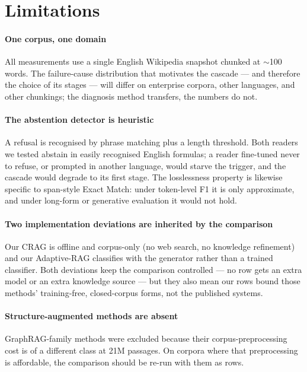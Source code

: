 \section{Limitations}
\label{sec:limitations}

\paragraph{One corpus, one domain} All measurements use a single English
Wikipedia snapshot chunked at $\sim$100 words. The failure-cause
distribution that motivates the cascade --- and therefore the choice of
its stages --- will differ on enterprise corpora, other languages, and
other chunkings; the diagnosis method transfers, the numbers do not.

\paragraph{The abstention detector is heuristic} A refusal is recognised
by phrase matching plus a length threshold. Both readers we tested
abstain in easily recognised English formulas; a reader fine-tuned never
to refuse, or prompted in another language, would starve the trigger, and
the cascade would degrade to its first stage. The losslessness property
is likewise specific to span-style Exact Match: under token-level F1 it
is only approximate, and under long-form or generative evaluation it
would not hold.

\paragraph{Two implementation deviations are inherited by the
comparison} Our CRAG is offline and corpus-only (no web search, no
knowledge refinement) and our Adaptive-RAG classifies with the generator
rather than a trained classifier. Both deviations keep the comparison
controlled --- no row gets an extra model or an extra knowledge source ---
but they also mean our rows bound those methods' training-free, closed-corpus
forms, not the published systems.

\paragraph{Structure-augmented methods are absent} GraphRAG-family
methods were excluded because their corpus-preprocessing cost is of a
different class at 21M passages. On corpora where that preprocessing is
affordable, the comparison should be re-run with them as rows.

